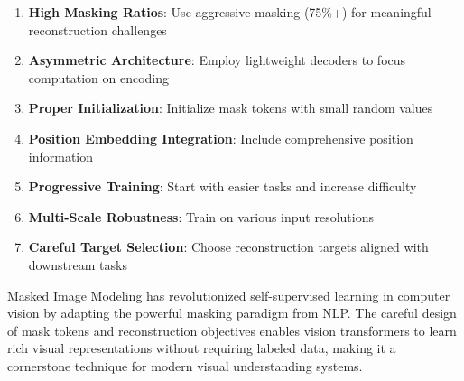 \begin{enumerate}
\item \textbf{High Masking Ratios}: Use aggressive masking (75\%+) for meaningful reconstruction challenges
\item \textbf{Asymmetric Architecture}: Employ lightweight decoders to focus computation on encoding
\item \textbf{Proper Initialization}: Initialize mask tokens with small random values
\item \textbf{Position Embedding Integration}: Include comprehensive position information
\item \textbf{Progressive Training}: Start with easier tasks and increase difficulty
\item \textbf{Multi-Scale Robustness}: Train on various input resolutions
\item \textbf{Careful Target Selection}: Choose reconstruction targets aligned with downstream tasks
\end{enumerate}
\begin{comment}
Feedback: This is a great summary. To make it more actionable:
1.  **High Masking Ratios**: "Don't be afraid to use very high masking ratios like 75%
2.  **Asymmetric Architecture**: "For efficient pre-training, ensure your encoder *only* processes the visible patches. Passing the full sequence of visible and masked tokens through a deep encoder is computationally wasteful and misses the key optimization of MAE."
3.  **Careful Target Selection**: "If your downstream task is semantic (like classification), pre-training with a feature-level reconstruction target (like DINO features) can often lead to better fine-tuning performance than simple pixel-level reconstruction, even if the reconstructed images look less visually appealing."
\end{comment}

Masked Image Modeling has revolutionized self-supervised learning in computer vision by adapting the powerful masking paradigm from NLP. The careful design of mask tokens and reconstruction objectives enables vision transformers to learn rich visual representations without requiring labeled data, making it a cornerstone technique for modern visual understanding systems.